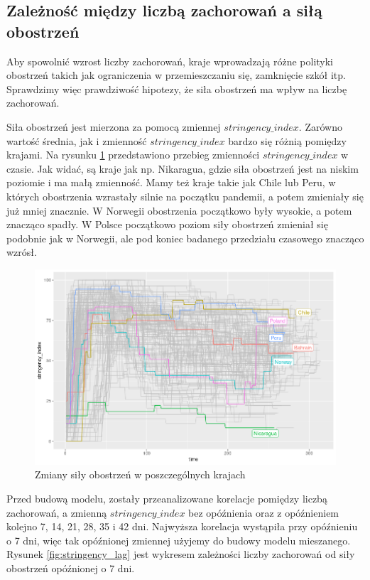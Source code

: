 \documentclass[12pt]{mwbk}
\theoremstyle{plain}
\theoremstyle{definition}
\theoremstyle{definition}
\newcommand\zrodlo[1]{\par\vspace{-3mm}{\small\textit{Źródło: }#1 }}
\begin{document}
\subsection{Zależność między liczbą zachorowań a siłą obostrzeń}

Aby spowolnić wzrost liczby zachorowań, kraje wprowadzają różne polityki obostrzeń takich jak ograniczenia w przemieszczaniu się, zamknięcie szkół itp. Sprawdzimy więc prawdziwość hipotezy, że siła obostrzeń ma wpływ na liczbę zachorowań.

Siła obostrzeń jest mierzona za pomocą zmiennej $stringency\_index$. Zarówno wartość średnia, jak i zmienność $stringency\_index$ bardzo się różnią pomiędzy krajami. Na rysunku \ref{fig:stringency_time} przedstawiono przebieg zmienności $stringency\_index$ w czasie. Jak widać, są kraje jak np. Nikaragua, gdzie siła obostrzeń jest na niskim poziomie i ma małą zmienność. Mamy też kraje takie jak Chile lub Peru, w których obostrzenia wzrastały silnie na początku pandemii, a potem zmieniały się już mniej znacznie. W Norwegii obostrzenia początkowo były wysokie, a potem znacząco spadły. W Polsce początkowo poziom siły obostrzeń zmieniał się podobnie jak w Norwegii, ale pod koniec badanego przedziału czasowego znacząco wzrósł.
 


\begin{figure}[!ht]
	\centering
	\includegraphics[width=\linewidth]{rys/stringency_time.png}
	\caption{Zmiany siły obostrzeń w poszczególnych krajach}
	\label{fig:stringency_time}
	\zrodlo{Opracowanie własne}
\end{figure}



Przed budową modelu, zostały przeanalizowane korelacje pomiędzy liczbą zachorowań, a zmienną $stringency\_index$ bez opóźnienia oraz z opóźnieniem kolejno 7, 14, 21, 28, 35 i 42 dni. Najwyższa korelacja wystąpiła przy opóźnieniu o 7 dni, więc tak opóźnionej zmiennej użyjemy do budowy modelu mieszanego. Rysunek \ref{fig:stringency_lag} jest wykresem zależności liczby zachorowań od siły obostrzeń opóźnionej o 7 dni.
\end{document}
